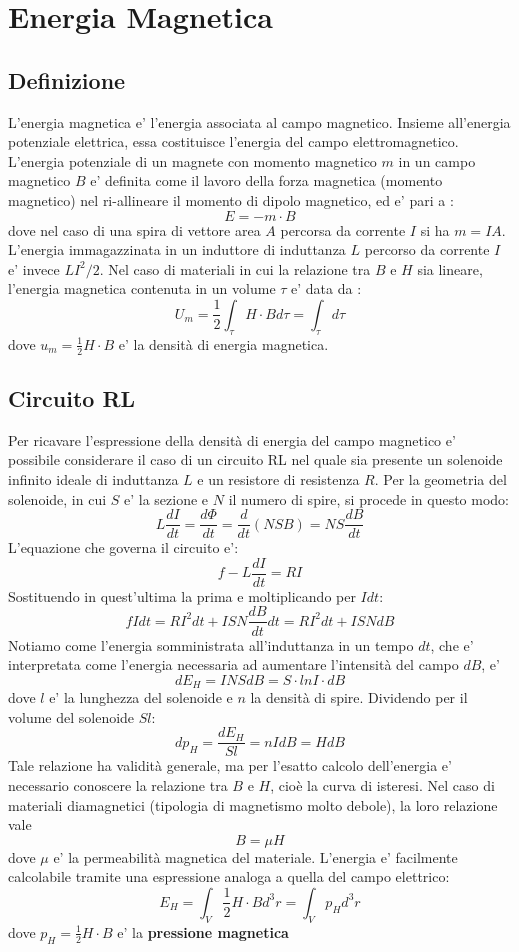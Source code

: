 \documentclass[a4paper, 10pt]{article}
\begin{document}
	\newpage
	\section{Energia Magnetica}
		\subsection{Definizione}
			L'energia magnetica e' l'energia associata al campo magnetico. Insieme all'energia potenziale elettrica, essa 
			costituisce l'energia del campo elettromagnetico. L'energia potenziale di un magnete con momento magnetico $m$ in un
			campo magnetico $B$ e' definita come il lavoro della forza magnetica (momento magnetico) nel ri-allineare il momento di
			dipolo magnetico, ed e' pari a :
			\[E = -m \cdot B \] dove nel caso di una spira di vettore area $A$ percorsa da corrente $I$ si ha $m = IA$. L'energia
			immagazzinata in un induttore di induttanza $L$ percorso da corrente $I$ e' invece $LI^2 / 2$.
			Nel caso di materiali in cui la relazione tra $B$ e $H$ sia lineare, l'energia magnetica contenuta in un volume 
			$\tau$ e' data da :
			\[ U_m = \frac{1}{2} \int_{\tau} H \cdot B d\tau = \int_{\tau} d\tau \] dove $u_m = \frac{1}{2}H \cdot B$ e'
			la densità di energia magnetica. 
		\subsection{Circuito RL}
			Per ricavare l'espressione della densità di energia del campo magnetico e' possibile considerare il caso di un 
			circuito RL nel quale sia presente un solenoide infinito ideale di induttanza $L$ e un resistore di resistenza $R$.
			Per la geometria del solenoide, in cui $S$ e' la sezione e $N$ il numero di spire, si procede in questo modo:
			\[ L \frac{dI}{dt} = \frac{d\Phi}{dt} = \frac{d}{dt}(NSB) = NS \frac{dB}{dt} \] 
			L'equazione che governa il circuito e':
			\[f - L \frac{dI}{dt} =  RI \] Sostituendo in quest'ultima la prima e moltiplicando per $I dt$:
			\[ fIdt = RI^2 dt + ISN \frac{dB}{dt} dt = RI^2 dt + ISN dB \]
			Notiamo come l'energia somministrata all'induttanza in un tempo $dt$, che e' interpretata come l'energia 
			necessaria ad aumentare l'intensità del campo $dB$, e'
			\[ dE_H = INS dB = S\cdot lnI \cdot dB \] dove $l$ e' la lunghezza del solenoide e $n$ la densità di spire. Dividendo
			per il volume del solenoide $Sl$:
			\[ dp_H = \frac{dE_H}{Sl} = nIdB = HdB \] Tale relazione ha validità generale, ma per l'esatto calcolo dell'energia e'
			necessario conoscere la relazione tra $B$ e $H$, cioè la curva di isteresi. Nel caso di materiali diamagnetici
			(tipologia di magnetismo molto debole), la loro relazione vale \[ B = \mu H\] dove $\mu$ e' la permeabilità magnetica 
			del materiale. L'energia e' facilmente calcolabile tramite una espressione analoga a quella del campo elettrico:
			\[ E_H = \int_V \frac{1}{2}H\cdot B d^3 r = \int_V p_H d^3 r \] dove $p_H = \frac{1}{2} H \cdot B$ e' la
			\textbf{pressione magnetica}
\end{document}
